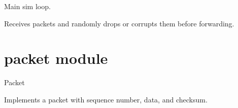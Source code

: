 \documentclass[letterpaper,10pt,english]{sphinxmanual}
\begin{document}
\begin{fulllineitems}
\begin{fulllineitems}
\begin{quote}
\begin{description}
\end{description}\end{quote}

\end{fulllineitems}


\begin{fulllineitems}
\label{\detokenize{network_simulator:network_simulator.NetworkSimulator.run}}
\pysigstartsignatures
\pysiglinewithargsret
{}
{}
{}
\pysigstopsignatures
\sphinxAtStartPar
Main sim loop.

\sphinxAtStartPar
Receives packets and randomly drops or corrupts them before forwarding.

\end{fulllineitems}


\end{fulllineitems}


\sphinxstepscope


\section{packet module}
\label{\detokenize{packet:module-packet}}\label{\detokenize{packet:packet-module}}\label{\detokenize{packet::doc}}
\sphinxAtStartPar
Packet

\sphinxAtStartPar
Implements a packet with sequence number, data, and checksum.
\end{document}
